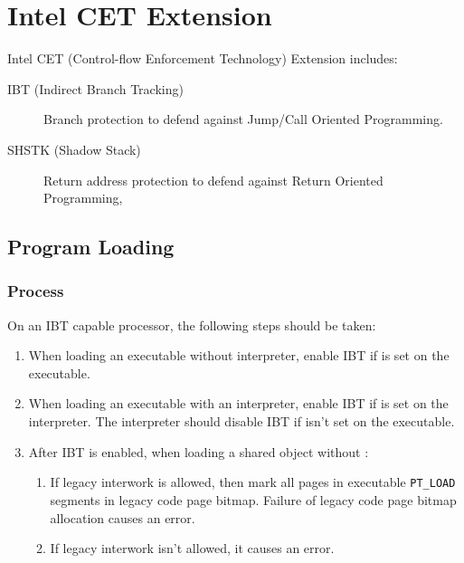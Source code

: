 \chapter{Intel CET Extension}

Intel CET (Control-flow Enforcement Technology) Extension includes:

\begin{description}
  \item[IBT (Indirect Branch Tracking)] Branch protection to defend
    against Jump/Call Oriented Programming.
  \item [SHSTK (Shadow Stack)] Return address protection to defend
    against Return Oriented Programming,
\end{description}

\section{Program Loading}

\subsection{Process }
\label{ibt}

On an IBT capable processor, the following steps should be taken:

\begin{enumerate}
  \item
    \begin{sloppypar}
      When loading an executable without interpreter, enable IBT if
       is set on the executable.
    \end{sloppypar}
  \item
    \begin{sloppypar}
      When loading an executable with an interpreter, enable IBT if
       is set on the interpreter.
      The interpreter should disable IBT if
       isn't set on the executable.
    \end{sloppypar}
  \item
    \begin{sloppypar}
      After IBT is enabled, when loading a shared object without
      :
   \end{sloppypar}
   \begin{enumerate}
    \item If legacy interwork is allowed, then mark all pages in
      executable \texttt{PT_LOAD} segments in legacy code page bitmap.
      Failure of legacy code page bitmap allocation causes an error.
    \item If legacy interwork isn't allowed, it causes an error.
   \end{enumerate}
\end{enumerate}

